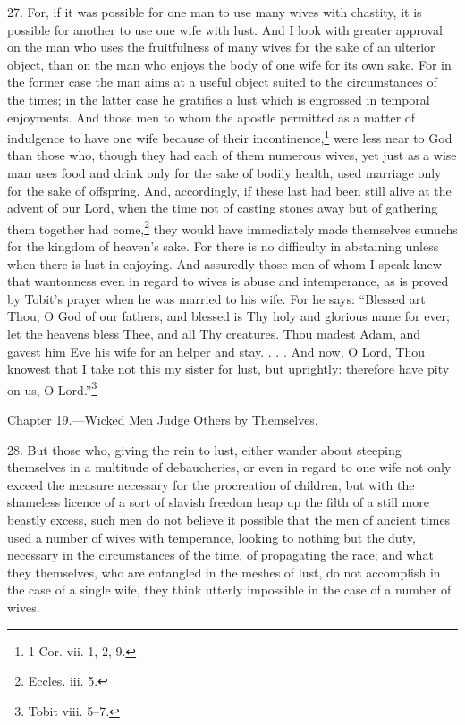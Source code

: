 27. For, if it was possible for one man to use many wives with chastity, it is possible for another to use one wife with lust. And I look with greater approval on the man who uses the fruitfulness of many wives for the sake of an ulterior object, than on the man who enjoys the body of one wife for its own sake. For in the former case the man aims at a useful object suited to the circumstances of the times; in the latter case he gratifies a lust which is engrossed in temporal enjoyments. And those men to whom the apostle permitted as a matter of indulgence to have one wife because of their incontinence,\footnote{1 Cor. vii. 1, 2, 9.} were less near to God than those who, though they had each of them numerous wives, yet just as a wise man uses food and drink only for the sake of bodily health, used marriage only for the sake of offspring. And, accordingly, if these last had been still alive at the advent of our Lord, when the time not of casting stones away but of gathering them together had come,\footnote{Eccles. iii. 5.} they would have immediately made themselves eunuchs for the kingdom of heaven’s sake. For there is no difficulty in abstaining unless when there is lust in enjoying. And assuredly those men of whom I speak knew that wantonness even in regard to wives is abuse and intemperance, as is proved by Tobit’s prayer when he was married to his wife. For he says: “Blessed art Thou, O God of our fathers, and blessed is Thy holy and glorious name for ever; let the heavens bless Thee, and all Thy creatures. Thou madest Adam, and gavest him Eve his wife for an helper and stay. . . . And now, O Lord, Thou knowest that I take not this my sister for lust, but uprightly: therefore have pity on us, O Lord.”\footnote{Tobit viii. 5–7.}


Chapter 19.—Wicked Men Judge Others by Themselves.

28. But those who, giving the rein to lust, either wander about steeping themselves in a multitude of debaucheries, or even in regard to one wife not only exceed the measure necessary for the procreation of children, but with the shameless licence of a sort of slavish freedom heap up the filth of a still more beastly excess, such men do not believe it possible that the men of ancient times used a number of wives with temperance, looking to nothing but the duty, necessary in the circumstances of the time, of propagating the race; and what they themselves, who are entangled in the meshes of lust, do not accomplish in the case of a single wife, they think utterly impossible in the case of a number of wives.


